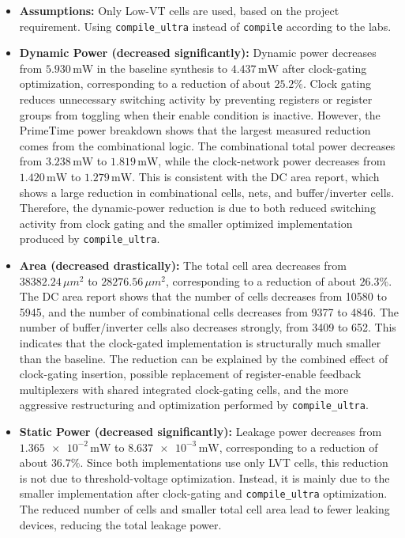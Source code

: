 \documentclass[11pt,a4paper]{article}
\begin{document}
\begin{itemize}
    \item \textbf{Assumptions:} Only Low-VT cells are used, based on the project requirement. Using \texttt{compile\_ultra} instead of \texttt{compile} according to the labs.

    \item \textbf{Dynamic Power (decreased significantly):}
    Dynamic power decreases from \(\num{5.930}\,\text{mW}\) in the baseline synthesis to \(\num{4.437}\,\text{mW}\) after clock-gating optimization, corresponding to a reduction of about \(25.2\%\). Clock gating reduces unnecessary switching activity by preventing registers or register groups from toggling when their enable condition is inactive. However, the PrimeTime power breakdown shows that the largest measured reduction comes from the combinational logic. The combinational total power decreases from \(\num{3.238}\,\text{mW}\) to \(\num{1.819}\,\text{mW}\), while the clock-network power decreases from \(\num{1.420}\,\text{mW}\) to \(\num{1.279}\,\text{mW}\). This is consistent with the DC area report, which shows a large reduction in combinational cells, nets, and buffer/inverter cells. Therefore, the dynamic-power reduction is due to both reduced switching activity from clock gating and the smaller optimized implementation produced by \texttt{compile\_ultra}.

    \item \textbf{Area (decreased drastically):}
    The total cell area decreases from \(38382.24\,\mu m^2\) to \(28276.56\,\mu m^2\), corresponding to a reduction of about \(26.3\%\). The DC area report shows that the number of cells decreases from 10580 to 5945, and the number of combinational cells decreases from 9377 to 4846. The number of buffer/inverter cells also decreases strongly, from 3409 to 652. This indicates that the clock-gated implementation is structurally much smaller than the baseline. The reduction can be explained by the combined effect of clock-gating insertion, possible replacement of register-enable feedback multiplexers with shared integrated clock-gating cells, and the more aggressive restructuring and optimization performed by \texttt{compile\_ultra}.

    \item \textbf{Static Power (decreased significantly):}
    Leakage power decreases from \(\num{1.365e-2}\,\text{mW}\) to \(\num{8.637e-3}\,\text{mW}\), corresponding to a reduction of about \(36.7\%\). Since both implementations use only LVT cells, this reduction is not due to threshold-voltage optimization. Instead, it is mainly due to the smaller implementation after clock-gating and \texttt{compile\_ultra} optimization. The reduced number of cells and smaller total cell area lead to fewer leaking devices, reducing the total leakage power.


\end{itemize}
\end{document}
